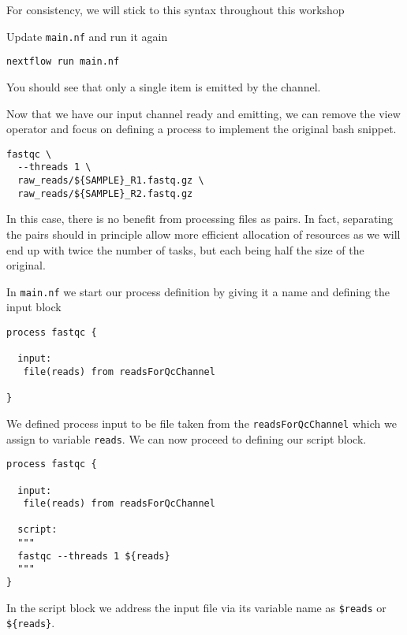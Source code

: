 For consistency, we will stick to this syntax throughout this workshop

\begin{steps}
Update \texttt{main.nf} and run it again
\begin{lstlisting}
nextflow run main.nf
\end{lstlisting}
\end{steps}

You should see that only a single item is emitted by the channel.

Now that we have our input channel ready and emitting, we can remove the view operator
and focus on defining a process to implement the original bash snippet.

\begin{lstlisting}
fastqc \
  --threads 1 \
  raw_reads/${SAMPLE}_R1.fastq.gz \
  raw_reads/${SAMPLE}_R2.fastq.gz
\end{lstlisting}

In this case, there is no benefit from processing files as pairs.
In fact, separating the pairs should in principle allow more efficient 
allocation of resources as we will end up with twice the number of tasks,
but each being half the size of the original.


In \texttt{main.nf} we start our process definition by giving it a name 
and defining the input block 
\begin{lstlisting}
process fastqc {
    
  input:
   file(reads) from readsForQcChannel

}
\end{lstlisting}

We defined process input to be file taken from the \texttt{readsForQcChannel} which we assign to variable \texttt{reads}. We can now proceed to defining our script block.


\begin{lstlisting}
process fastqc {
    
  input:
   file(reads) from readsForQcChannel

  script:
  """
  fastqc --threads 1 ${reads}
  """
}
\end{lstlisting}

In the script block we address the input file via its variable name as \texttt{\$reads} or \texttt{\$\{reads\}}.

